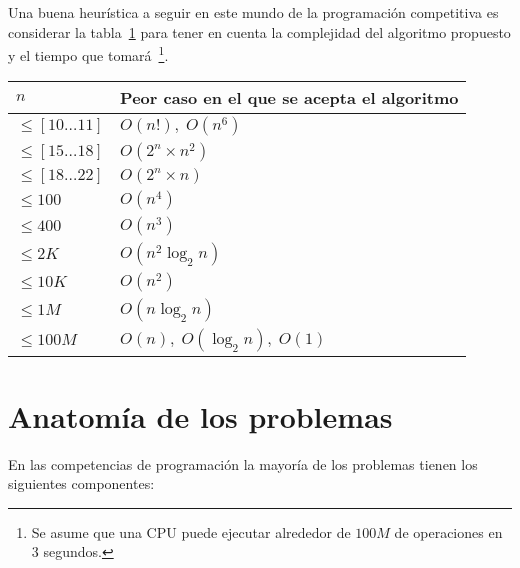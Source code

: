 Una buena heurística a seguir en este mundo de la programación competitiva es 
considerar la tabla~\ref{cap5:tabla:complejidades}
para tener en cuenta la complejidad del algoritmo propuesto y el tiempo que 
tomará~\footnote{
    Se asume que una CPU puede ejecutar alrededor de $100M$ de operaciones en 3 segundos.
}.
\begin{table}[H]
\centering
\begin{tabular}{l|l}
\hline
$n$                   & Peor caso en el que se acepta el algoritmo  \\ \hline
$\leq [10 \ldots 11]$ & $O(n!), \; O(n^6)$                          \\
$\leq [15 \ldots 18]$ & $O(2^n \times n^2)$                         \\
$\leq [18 \ldots 22]$ & $O(2^n \times n)$                           \\
$\leq 100$            & $O(n^4)$                                    \\
$\leq 400$            & $O(n^3)$                                    \\
$\leq 2K$             & $O(n^2 \log_2 n)$                           \\
$\leq 10K$            & $O(n^2)$                                    \\
$\leq 1M$             & $O(n \log_2 n)$                             \\
$\leq 100M$           & $O(n), \; O(\log_2 n), \; O(1)$             \\ \hline
\end{tabular}
\label{cap5:tabla:complejidades}
\end{table}

\section{Anatomía de los problemas}

En las competencias de programación la mayoría de los problemas tienen los siguientes componentes:

